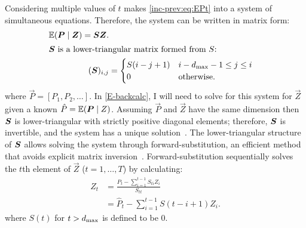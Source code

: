 \documentclass[thesis.tex]{subfiles}
\begin{document}
Considering multiple values of $t$ makes \cref{inc-prev:eq:EPt} into a system of simultaneous equations.
Therefore, the system can be written in matrix form:
\begin{align}
  \operatorname{\mathbb{E}}(\bm{P} \mid \bm{Z}) = \bm{S} \bm{Z}. \label{inc-prev:eq:EPt-matrix} \\
\intertext{$\bm{S}$ is a lower-triangular matrix formed from $S$:}
    (\bm{S})_{i,j} &= \begin{cases}
        S(i - j + 1) & i - d_\text{max} - 1 \leq j \leq i \\
        0 & \text{otherwise.}
    \end{cases} \label{inc-prev:eq:Smatrix}
\end{align}
where $\vec{P} = [P_1, P_2, \dots]$.
In \cref{E-backcalc}, I will need to solve for this system for $\vec{Z}$ given a known $\hat{P} = \operatorname{\mathbb{E}}(\bm{P} \mid {Z})$.
Assuming $\vec{P}$ and $\vec{Z}$ have the same dimension then $\bm{S}$ is lower-triangular with strictly positive diagonal elements; therefore, $\bm{S}$ is invertible, and the system has a unique solution~\autocite[424]{bernsteinFacts}.
The lower-triangular structure of $\bm{S}$ allows solving the system through forward-substitution, an efficient method that avoids explicit matrix inversion~\autocite{cormenMatrix}.
Forward-substitution sequentially solves the $t$th element of $\vec{Z}$ ($t = 1, \dots, T$) by calculating:
\begin{align}
Z_t
&= \frac{\hat{P}_t - \sum_{i=1}^{t-1} S_{ti} Z_i}{S_{tt}} \\
&= \hat{P}_t - \sum_{i=1}^{t-1} S(t - i + 1) Z_i.
\label{inc-prev:eq:forward-substitute}
\end{align}
where $S(t)$ for $t > d_\text{max}$ is defined to be 0.

\end{document}
